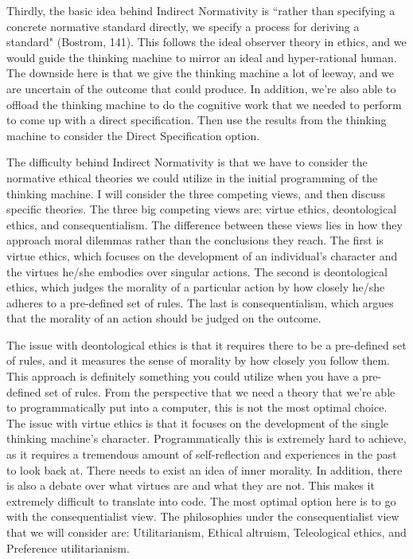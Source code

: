 \documentclass[11pt, oneside]{article}
\begin{document}
\par 
Thirdly, the basic idea behind Indirect Normativity is ``rather than specifying a concrete normative standard directly, we specify a process for deriving a standard" (Bostrom, 141). This follows the ideal observer theory in ethics, and we would guide the thinking machine to mirror an ideal and hyper-rational human. 
The downside here is that we give the thinking machine a lot of leeway, and we are uncertain of the outcome that could produce. 
In addition, we're also able to offload the thinking machine to do the cognitive work that we needed to perform to come up with a direct specification. Then use the results from the thinking machine to consider the Direct Specification option.
\par 
The difficulty behind Indirect Normativity is that we have to consider the normative ethical theories we could utilize in the initial programming of the thinking machine. I will consider the three competing views, and then discuss specific theories. The three big competing views are: virtue ethics, deontological ethics, and consequentialism. The difference between these views lies in how they approach moral dilemmas rather than the conclusions they reach. 
The first is virtue ethics, which focuses on the development of an individual's character and the virtues he/she embodies over singular actions. The second is deontological ethics, which judges the morality of a particular action by how closely he/she adheres to a pre-defined set of rules. The last is consequentialism, which argues that the morality of an action should be judged on the outcome. 
\par 
The issue with deontological ethics is that it requires there to be a pre-defined set of rules, and it measures the sense of morality by how closely you follow them. This approach is definitely something you could utilize when you have a pre-defined set of rules. From the perspective that we need a theory that we're able to programmatically put into a computer, this is not the most optimal choice.
The issue with virtue ethics is that it focuses on the development of the single thinking machine's character. Programmatically this is extremely hard to achieve, as it requires a tremendous amount of self-reflection and experiences in the past to look back at. There needs to exist an idea of inner morality. In addition, there is also a debate over what virtues are and what they are not. This makes it extremely difficult to translate into code.
The most optimal option here is to go with the consequentialist view. The philosophies under the consequentialist view that we will consider are: Utilitarianism, Ethical altruism, Teleological ethics, and Preference utilitarianism.
\par 
\end{document}
